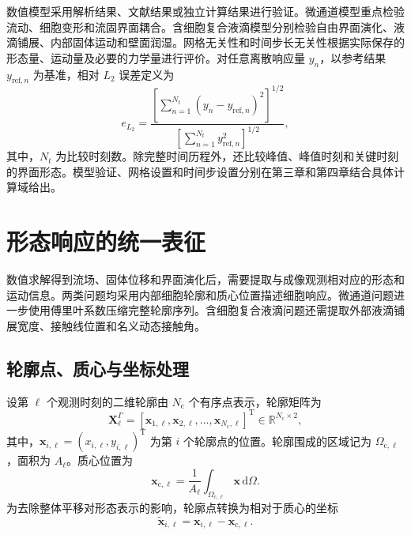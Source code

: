 数值模型采用解析结果、文献结果或独立计算结果进行验证。微通道模型重点检验流动、细胞变形和流固界面耦合。含细胞复合液滴模型分别检验自由界面演化、液滴铺展、内部固体运动和壁面润湿。网格无关性和时间步长无关性根据实际保存的形态量、运动量及必要的力学量进行评价。对任意离散响应量 $y_n$，以参考结果 $y_{\mathrm{ref},n}$ 为基准，相对 $L_2$ 误差定义为
\begin{equation}
e_{L_2}
=
\frac{
\left[
\sum_{n=1}^{N_t}
\left(y_n-y_{\mathrm{ref},n}\right)^2
\right]^{1/2}}
{
\left[
\sum_{n=1}^{N_t}
y_{\mathrm{ref},n}^2
\right]^{1/2}},
\label{eq:ch2_relative_l2}
\end{equation}
其中，$N_t$ 为比较时刻数。除完整时间历程外，还比较峰值、峰值时刻和关键时刻的界面形态。模型验证、网格设置和时间步设置分别在第三章和第四章结合具体计算域给出。

\section{形态响应的统一表征}

数值求解得到流场、固体位移和界面演化后，需要提取与成像观测相对应的形态和运动信息。两类问题均采用内部细胞轮廓和质心位置描述细胞响应。微通道问题进一步使用傅里叶系数压缩完整轮廓序列。含细胞复合液滴问题还需提取外部液滴铺展宽度、接触线位置和名义动态接触角。

\subsection{轮廓点、质心与坐标处理}

设第 $\ell$ 个观测时刻的二维轮廓由 $N_{\mathrm c}$ 个有序点表示，轮廓矩阵为
\begin{equation}
\boldsymbol{X}_{\ell}^{\Gamma}
=
\left[
\boldsymbol{x}_{1,\ell},
\boldsymbol{x}_{2,\ell},
\ldots,
\boldsymbol{x}_{N_{\mathrm c},\ell}
\right]^{\mathrm T}
\in
\mathbb{R}^{N_{\mathrm c}\times2},
\label{eq:ch2_contour_matrix}
\end{equation}
其中，$\boldsymbol{x}_{i,\ell}=(x_{i,\ell},y_{i,\ell})^{\mathrm T}$ 为第 $i$ 个轮廓点的位置。轮廓围成的区域记为 $\Omega_{\mathrm c,\ell}$，面积为 $A_{\ell}$。质心位置为
\begin{equation}
\boldsymbol{x}_{\mathrm c,\ell}
=
\frac{1}{A_{\ell}}
\int_{\Omega_{\mathrm c,\ell}}
\boldsymbol{x}\,\mathrm d\Omega.
\label{eq:ch2_centroid}
\end{equation}
为去除整体平移对形态表示的影响，轮廓点转换为相对于质心的坐标
\begin{equation}
\widetilde{\boldsymbol{x}}_{i,\ell}
=
\boldsymbol{x}_{i,\ell}
-
\boldsymbol{x}_{\mathrm c,\ell}.
\label{eq:ch2_centroid_alignment}
\end{equation}

